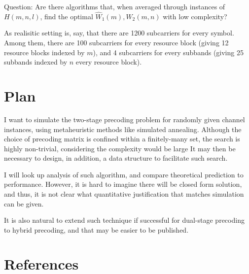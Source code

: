 \documentclass[12pt]{article}
\begin{document}
Question: Are there algorithms that, when averaged through instances of \(H(m,n,l)\), find the optimal \(\hat{W}_1(m), \hat{W}_2(m,n)\) with low complexity?

As realisitic setting is, say, that there are 1200 subcarriers for every symbol.
Among them, there are 100 subcarriers for every resource block (giving 12 resource blocks indexed by \(m\)), and 4 subcarriers for every subbands (giving 25 subbands indexed by \(n\) every resource block).

\section{Plan}

I want to simulate the two-stage precoding problem for randomly given channel instances, using metaheuristic methods like simulated annealing.
Although the choice of precoding matrix is confined within a finitely-many set, the search is highly non-trivial, considering the complexity would be large 
It may then be necessary to design, in addition, a data structure to facilitate such search.

I will look up analysis of such algorithm, and compare theoretical prediction to performance.
However, it is hard to imagine there will be closed form solution, and thus, it is not clear what quantitative justification that matches simulation can be given.

It is also natural to extend such technique if successful for dual-stage precoding to hybrid precoding, and that may be easier to be published.

\section{References}
\end{document}
